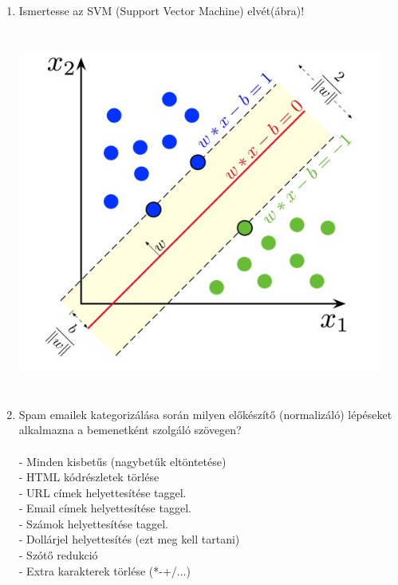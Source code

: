 \documentclass[12pt]{article}
\begin{document}
\begin{enumerate}
\item Ismertesse az SVM (Support Vector Machine) elvét(ábra)!
\begin{center}
\includegraphics[width=12cm,height=12cm,keepaspectratio]{./pics/SVM.jpg}
\end{center}

\item Spam emailek kategorizálása során milyen előkészítő (normalizáló) lépéseket alkalmazna a bemenetként szolgáló szövegen?\\
\\
- Minden kisbetűs (nagybetűk eltöntetése)\\
- HTML kódrészletek törlése\\
- URL címek helyettesítése taggel.\\
- Email címek helyettesítése taggel.\\
- Számok helyettesítése taggel.\\
- Dollárjel helyettesítés (ezt meg kell tartani)\\
- Szótő redukció\\
- Extra karakterek törlése (*-+/...)\\


\end{enumerate}
\end{document}
